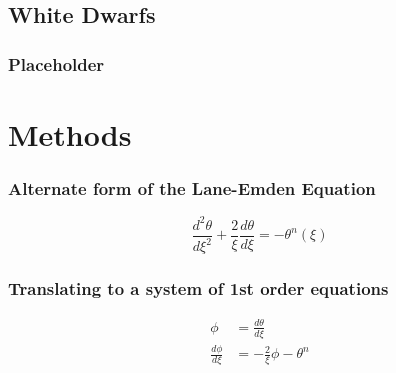 \documentclass{beamer}
\begin{document}
%
%
%
%
%
%
%

        \subsection{White Dwarfs}

        \begin{frame}
            \frametitle{Placeholder}

        \end{frame}

    \section{Methods}

        \begin{frame}
            \frametitle{Alternate form of the Lane-Emden Equation}

            \[\frac{d^2\theta}{d\xi^2}+\frac{2}{\xi}\frac{d\theta}{d\xi}=-\theta^n(\xi)\]

        \end{frame}

        \begin{frame}
            \frametitle{Translating to a system of 1st order equations}

            \begin{align*}
                \phi &= \frac{d\theta}{d\xi} \\
                \frac{d\phi}{d\xi} &= -\frac{2}{\xi}\phi - \theta^n
            \end{align*}

        \end{frame}
\end{document}
